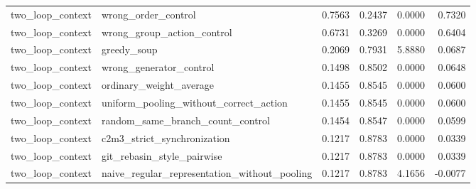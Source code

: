 \begin{tabular}{llrrrr}
two_loop_context & wrong_order_control & 0.7563 & 0.2437 & 0.0000 & 0.7320 \\
two_loop_context & wrong_group_action_control & 0.6731 & 0.3269 & 0.0000 & 0.6404 \\
two_loop_context & greedy_soup & 0.2069 & 0.7931 & 5.8880 & 0.0687 \\
two_loop_context & wrong_generator_control & 0.1498 & 0.8502 & 0.0000 & 0.0648 \\
two_loop_context & ordinary_weight_average & 0.1455 & 0.8545 & 0.0000 & 0.0600 \\
two_loop_context & uniform_pooling_without_correct_action & 0.1455 & 0.8545 & 0.0000 & 0.0600 \\
two_loop_context & random_same_branch_count_control & 0.1454 & 0.8547 & 0.0000 & 0.0599 \\
two_loop_context & c2m3_strict_synchronization & 0.1217 & 0.8783 & 0.0000 & 0.0339 \\
two_loop_context & git_rebasin_style_pairwise & 0.1217 & 0.8783 & 0.0000 & 0.0339 \\
two_loop_context & naive_regular_representation_without_pooling & 0.1217 & 0.8783 & 4.1656 & -0.0077 \\
\bottomrule
\end{tabular}
